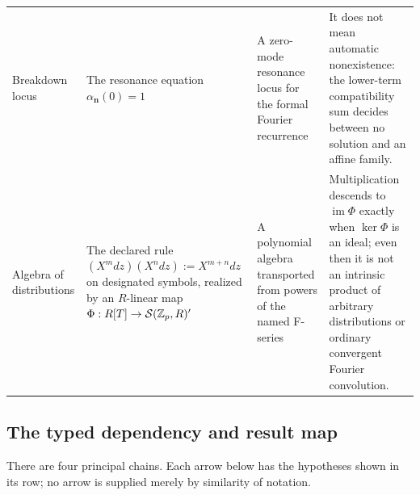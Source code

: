 \begin{longtable}{@{}p{}p{}p{}p{}@{}}
Breakdown locus & The resonance equation
$\alpha_{\mathbf n}(0)=1$ & A zero-mode resonance locus for the formal
Fourier recurrence & It does not mean automatic nonexistence: the lower-term
compatibility sum decides between no solution and an affine family.\\

Algebra of distributions & The declared rule
$(X^m dz)(X^n dz):=X^{m+n}dz$ on designated symbols, realized by an
$R$-linear map $\Phi:R[T]\to\mathcal S(\mathbb Z_p,R)'$ & A polynomial algebra
transported from powers of the named F-series & Multiplication descends to
$\operatorname{im}\Phi$ exactly when $\ker\Phi$ is an ideal; even then it is
not an intrinsic product of arbitrary distributions or ordinary convergent
Fourier convolution.\\
\bottomrule
\end{longtable}
\endgroup

\subsection{The typed dependency and result map}

There are four principal chains.  Each arrow below has the hypotheses shown
in its row; no arrow is supplied merely by similarity of notation.

